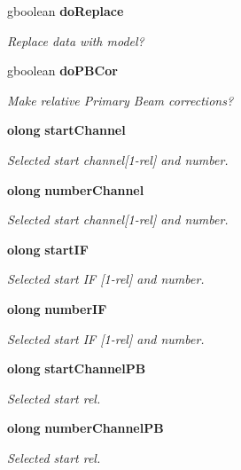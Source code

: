 \begin{CompactItemize}
gboolean {\bf do\-Replace}
\begin{CompactList}\small\item\em Replace data with model? \item\end{CompactList}\item 
gboolean {\bf do\-PBCor}
\begin{CompactList}\small\item\em Make relative Primary Beam corrections? \item\end{CompactList}\item 
{\bf olong} {\bf start\-Channel}
\begin{CompactList}\small\item\em Selected start channel[1-rel] and number. \item\end{CompactList}\item 
{\bf olong} {\bf number\-Channel}
\begin{CompactList}\small\item\em Selected start channel[1-rel] and number. \item\end{CompactList}\item 
{\bf olong} {\bf start\-IF}
\begin{CompactList}\small\item\em Selected start IF [1-rel] and number. \item\end{CompactList}\item 
{\bf olong} {\bf number\-IF}
\begin{CompactList}\small\item\em Selected start IF [1-rel] and number. \item\end{CompactList}\item 
{\bf olong} {\bf start\-Channel\-PB}
\begin{CompactList}\small\item\em Selected start rel. \item\end{CompactList}\item 
{\bf olong} {\bf number\-Channel\-PB}
\begin{CompactList}\small\item\em Selected start rel. \item\end{CompactList}\item 

\end{CompactItemize}
